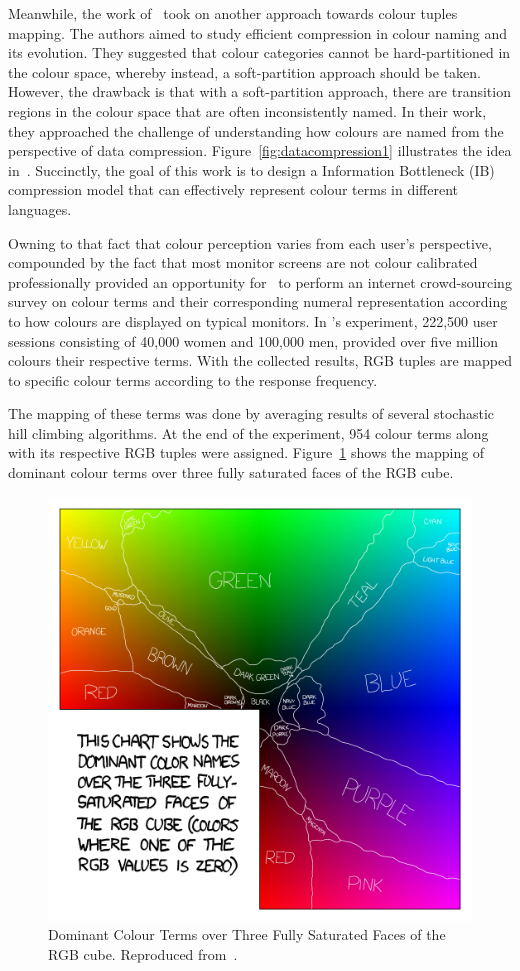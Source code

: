Meanwhile, the work of~\cite{zaslavsky2018efficient} took on another approach towards
colour tuples mapping. The authors aimed to study efficient compression in colour naming and its evolution. They suggested that colour categories cannot be hard-partitioned in the colour space, whereby instead, a soft-partition approach should be taken. However, the drawback is that with a soft-partition approach, there are transition regions in the colour space that are often inconsistently named. In their work, they approached the challenge of understanding how colours are named from the perspective of data compression. Figure~\ref{fig:datacompression1} illustrates the idea in~\cite{zaslavsky2018efficient}. Succinctly, the goal of this work is to design a Information Bottleneck (IB) compression model that can effectively represent colour terms in different languages.

Owning to that fact that colour perception varies from each user's perspective, compounded by the fact that most monitor screens are not colour calibrated professionally provided an opportunity for~ to perform an internet crowd-sourcing survey on colour terms and their corresponding numeral representation according to how colours are displayed on typical monitors.
In 's experiment, 222,500 user sessions consisting of 40,000 women and 100,000 men, provided over five million colours their respective terms. With the collected results, RGB tuples are mapped to specific colour terms according to the response frequency.

The mapping of these terms was done by averaging results of several stochastic hill climbing algorithms. At the end of the experiment, 954 colour terms along with its respective RGB tuples were assigned.
Figure~\ref{fig:xkcd} shows the mapping of dominant colour terms over three fully saturated faces of the RGB cube.

\begin{figure}[!hbt]\centering
\includegraphics[width=.6\textwidth]{image/general/xkcd.png}
\caption[Dominant Colour Terms over Three Fully Saturated Faces of the RGB cube.]{Dominant Colour Terms over Three Fully Saturated Faces of the RGB cube. Reproduced from~.}
\label{fig:xkcd}
\end{figure}

